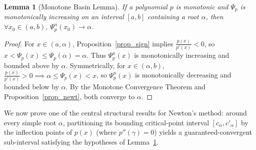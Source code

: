 \documentclass{amsart}
\newtheorem{lemma}{Lemma}
\begin{document}
\begin{lemma}[Monotone Basin Lemma]\label{lemma_root_interval}
    If a polynomial $p$ is monotonic and $\Psi_p$ is monotonically increasing on an interval $[a,b]$ containing a root $\alpha$, then $\forall x_0 \in (a,b)$, $\Psi_p^n(x_0) \to \alpha$.
\end{lemma}
\begin{proof}
    For $x \in (a, \alpha)$, Proposition~\ref{prop_sign} implies $\frac{p(x)}{p'(x)} < 0$, so $x < \Psi_p(x) \leq \Psi_p(\alpha) = \alpha$. Thus $\Psi_p^n(x)$ is monotonically increasing and bounded above by $\alpha$. Symmetrically, for $x \in (\alpha, b)$, $\frac{p(x)}{p'(x)} > 0 \implies \alpha \leq \Psi_p(x) < x$, so $\Psi_p^n(x)$ is monotonically decreasing and bounded below by $\alpha$. By the Monotone Convergence Theorem and Proposition~\ref{prop_newt}, both converge to $\alpha$.
\end{proof}

We now prove one of the central structural results for Newton's method: around every simple root $\alpha$, partitioning its bounding critical-point interval $[c_\alpha, c'_\alpha]$ by the inflection points of $p(x)$ (where $p''(\gamma) = 0$) yields a guaranteed-convergent sub-interval satisfying the hypotheses of Lemma~\ref{lemma_root_interval}.
\end{document}
